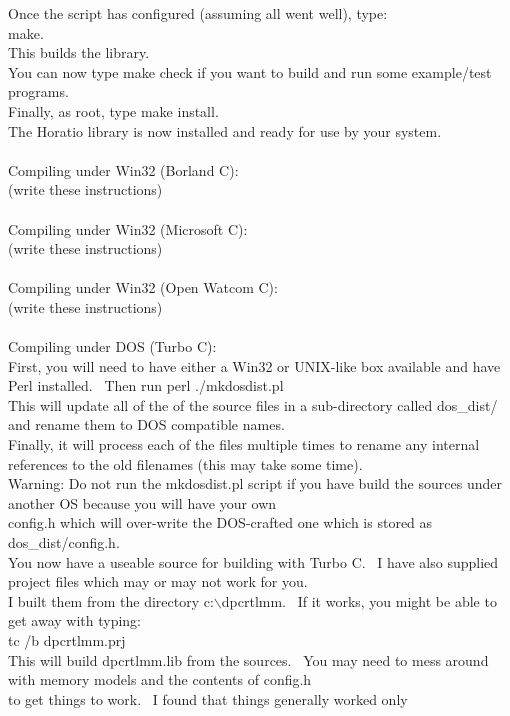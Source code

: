 \documentclass{article}
\begin{document}
Once the script has configured
(assuming all went well), type:\\
make.\\
This builds the library.\\
You can now type make check if you
want to build and run some
example/test programs.\\
Finally, as root, type make
install.\\
The Horatio library is now
installed and ready for use by your system.\\
\\
Compiling under Win32 (Borland C):\\
(write these instructions)\\
\\
Compiling under Win32 (Microsoft C):\\
(write these instructions)\\
\\
Compiling under Win32 (Open Watcom C):\\
(write these instructions)\\
\\
Compiling under DOS (Turbo C):\\
First, you will need to have
either a Win32 or UNIX-like box available and have Perl
installed.~ Then run perl ./mkdosdist.pl\\
This will update all of the of the source files in a sub-directory
called dos\_dist/ and rename them to DOS compatible names.\\
Finally, it will process each of the files multiple times to rename any
internal references to the old filenames (this may take some time).\\
Warning: Do not run the mkdosdist.pl script if you have build the
sources under another OS because you will have your own\\
config.h which will over-write the DOS-crafted one which is stored as
dos\_dist/config.h.\\
You now have a useable source for building with Turbo C.~ I have
also supplied project files which may or may not work for you.\\
I built them from the directory c:$\backslash$dpcrtlmm.~ If it works, you
might be able to get away with typing:\\
tc /b dpcrtlmm.prj\\
This will build dpcrtlmm.lib from the sources.~ You may need to
mess around with memory models and the contents of config.h\\
to get things to work.~ I found that things generally worked only
\end{document}
